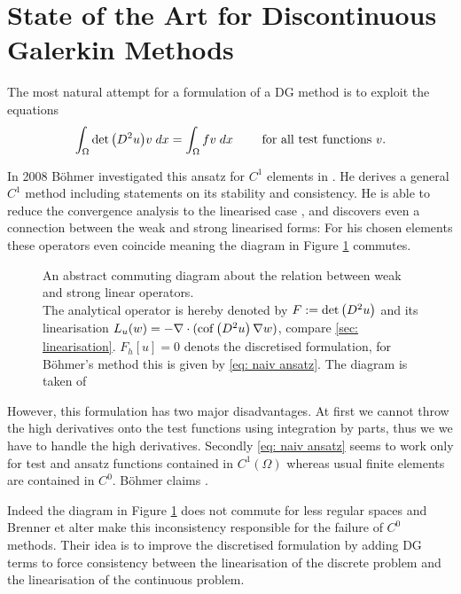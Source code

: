 \section{State of the Art for Discontinuous Galerkin Methods} %

The most natural attempt for a formulation of a DG method is to exploit the equations
\begin{align}
	\int_{\Omega} {{\det{\left(D^2 u\right)} v}\;dx} = \int_{\Omega} {{fv}\;dx} \qquad \text{ for all test functions } v. \label{eq: naiv ansatz}
\end{align}

In 2008 B\"ohmer investigated this ansatz for $C^1$ elements in \cite{Boehmer2008}. He derives a general $C^1$ method including statements on its stability and consistency. 
He is able to reduce the convergence analysis to the linearised case \cite[Section 9]{Boehmer2008}, and discovers even a connection between the weak and strong linearised forms: For his chosen elements these operators even coincide meaning the diagram in Figure \ref{fig: fe diagram} commutes.
\begin{figure}[H]
	
	\caption{An abstract commuting diagram about the relation between weak and strong linear operators.\\ The analytical \MA operator is hereby denoted by $F:=\det{\left(D^2 u\right)}$ and its linearisation $L_u(w) = -\nabla \cdot (\operatorname{cof} \left( D^2 u \right) \nabla w)$, compare \ref{sec: linearisation}. $F_h[u]=0$ denots the discretised formulation, for B\"ohmer's method this is given by \eqref{eq: naiv ansatz}. The diagram is taken of \cite[Fig 2.2]{FGN2013}}
	\label{fig: fe diagram}	
\end{figure}
However, this formulation has two major disadvantages. 
At first we cannot throw the high derivatives onto the test functions using integration by parts, thus we we have to handle the high derivatives. Secondly \eqref{eq: naiv ansatz} seems to work only for test and ansatz functions contained in $C^1(\Omega)$ whereas usual finite elements are contained in $C^0$. B\"ohmer claims \cite[p.1214]{Boehmer2008}.

Indeed the diagram in Figure \ref{fig: fe diagram} does not commute for less regular spaces and Brenner et alter make this inconsistency responsible for the failure of $C^0$ methods\cite{BGN+2011}. Their idea is to improve the discretised formulation by adding DG terms to force consistency between the linearisation of the discrete problem and the linearisation of the continuous problem.

